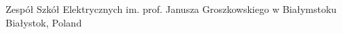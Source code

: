 

\begin{cventries}

  \cventry
    {} %
    {Zespół Szkół Elektrycznych im. prof. Janusza Groszkowskiego w Białymstoku} %
    {Białystok, Poland} %
    {} %
    {}

\end{cventries}
